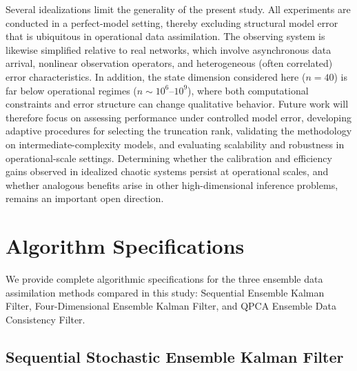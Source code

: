 \documentclass[11pt,a4paper]{article}
\begin{document}
Several idealizations limit the generality of the present study. All experiments are conducted in a perfect-model setting, thereby excluding structural model error that is ubiquitous in operational data assimilation. The observing system is likewise simplified relative to real networks, which involve asynchronous data arrival, nonlinear observation operators, and heterogeneous (often correlated) error characteristics. In addition, the state dimension considered here ($n=40$) is far below operational regimes ($n\sim 10^6$--$10^9$), where both computational constraints and error structure can change qualitative behavior. Future work will therefore focus on assessing performance under controlled model error, developing adaptive procedures for selecting the truncation rank, validating the methodology on intermediate-complexity models, and evaluating scalability and robustness in operational-scale settings.
Determining whether the calibration and efficiency gains observed in idealized chaotic systems persist at operational scales, and whether analogous benefits arise in other high-dimensional inference problems, remains an important open direction.


\FloatBarrier





\appendix



\section{Algorithm Specifications}\label{app:algorithms}

We provide complete algorithmic specifications for the three ensemble data assimilation methods compared in this study: Sequential Ensemble Kalman Filter, Four-Dimensional Ensemble Kalman Filter, and QPCA Ensemble Data Consistency Filter.

\subsection{Sequential Stochastic Ensemble Kalman Filter}\label{app:seq_enkf}
\end{document}
